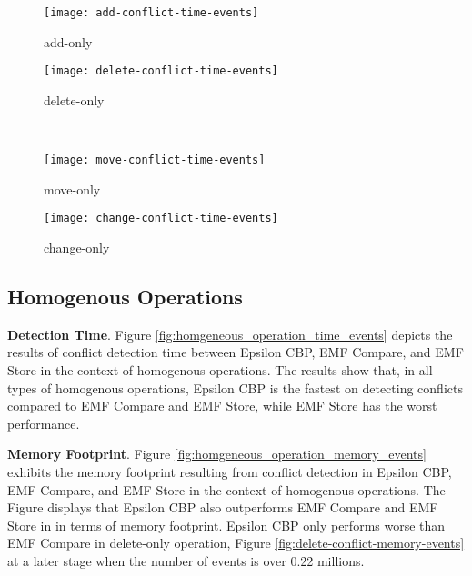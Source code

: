 \begin{figure*}[ht]
  \centering
  \begin{subfigure}[t]{0.495\linewidth}
    \texttt{[image: add-conflict-time-events]}
    \caption{add-only}
    \label{fig:add-conflict-time-events}
  \end{subfigure}
  \hfill
  \begin{subfigure}[t]{0.495\linewidth}
    \texttt{[image: delete-conflict-time-events]}
    \caption{delete-only}
    \label{fig:delete-conflict-time-events}
  \end{subfigure}
  \\
  \begin{subfigure}[t]{0.495\linewidth}
    \texttt{[image: move-conflict-time-events]}
    \caption{move-only}
    \label{fig:move-conflict-time-events}
  \end{subfigure}
  \hfill
  \begin{subfigure}[t]{0.495\linewidth}
    \texttt{[image: change-conflict-time-events]}
    \caption{change-only}
    \label{fig:change-conflict-time-events}
  \end{subfigure}
  \caption{Conflict detection time for homogeneous operations.}
  \label{fig:homgeneous_operation_time_events}
\end{figure*}

\subsection{Homogenous Operations}
\label{sec:homogenous-operation_conflict}

\textbf{Detection Time}. Figure \ref{fig:homgeneous_operation_time_events} depicts the results of conflict detection time between Epsilon CBP, EMF Compare, and EMF Store in the context of homogenous operations. The results show that, in all types of homogenous operations, Epsilon CBP is the fastest on detecting conflicts compared to EMF Compare and EMF Store, while EMF Store has the worst performance. 

\textbf{Memory Footprint}. Figure \ref{fig:homgeneous_operation_memory_events} exhibits the memory footprint resulting from conflict detection in Epsilon CBP, EMF Compare, and EMF Store in the context of homogenous operations. The Figure displays that Epsilon CBP also outperforms EMF Compare and EMF Store in in terms of memory footprint. Epsilon CBP only performs worse than EMF Compare in delete-only operation, Figure \ref{fig:delete-conflict-memory-events} at a later stage when the number of events is over 0.22 millions.  

